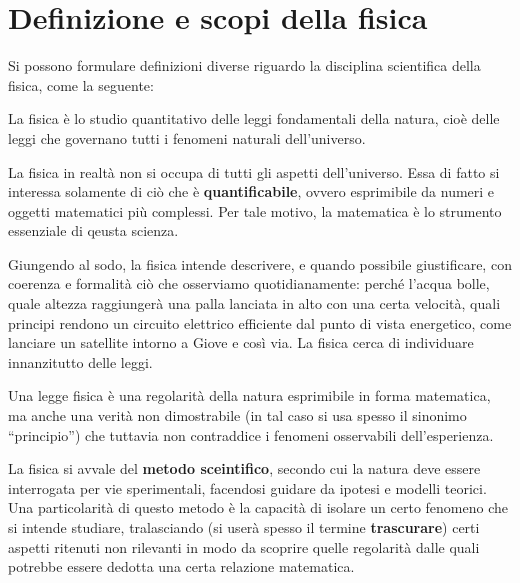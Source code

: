 \marginpar{\minitoc}

\section[Definizione e scopi]{Definizione e scopi della fisica}

Si possono formulare definizioni diverse riguardo la disciplina scientifica
della fisica, come la seguente:

\begin{tcolorbox}[colback = yellow!30, colframe = yellow!30!black, title = {Fisica}]
La fisica è lo studio quantitativo delle leggi fondamentali della natura, cioè
delle leggi che governano tutti i fenomeni naturali dell'universo.
\end{tcolorbox}

\noindent La fisica in realtà non si occupa di tutti gli aspetti dell'universo.
Essa di fatto si interessa solamente di ciò che è \textbf{quantificabile}, ovvero
esprimibile da numeri e oggetti matematici più complessi. Per tale motivo,
la matematica è lo strumento essenziale di qeusta scienza.

Giungendo al sodo, la fisica intende descrivere, e quando possibile giustificare,
con coerenza e formalità ciò che osserviamo quotidianamente: perché l'acqua
bolle, quale altezza raggiungerà una palla lanciata in alto con una certa
velocità, quali principi rendono un circuito elettrico efficiente dal punto
di vista energetico, come lanciare un satellite intorno a Giove e così via. La
fisica cerca di individuare innanzitutto delle leggi.




\begin{tcolorbox}[colback = yellow!30, colframe = yellow!30!black, title = {Legge}]
    Una legge fisica è una regolarità della natura esprimibile in forma
    matematica, ma anche una verità non dimostrabile (in tal caso si usa spesso il
    sinonimo ``principio'') che tuttavia non contraddice i
    fenomeni osservabili dell'esperienza.
\end{tcolorbox}

\noindent La fisica si avvale del \textbf{metodo sceintifico}, secondo cui la natura deve
essere interrogata per vie sperimentali, facendosi guidare da ipotesi e
modelli teorici. Una particolarità di questo metodo è la capacità di isolare
un certo fenomeno che si intende studiare, tralasciando (si userà spesso il
termine \textbf{trascurare}) certi aspetti ritenuti non rilevanti in modo da
scoprire quelle regolarità dalle quali potrebbe essere dedotta una certa
relazione matematica.

